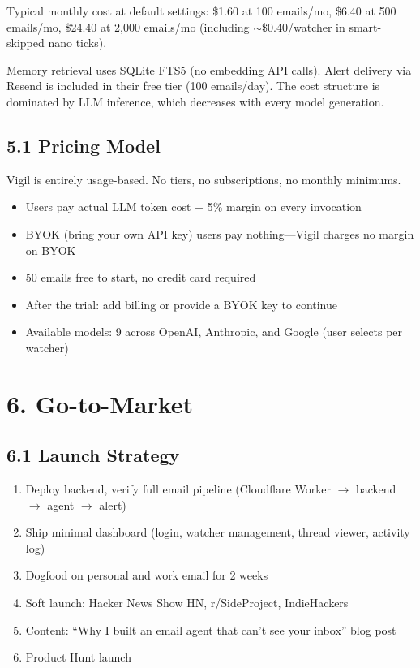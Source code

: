 \documentclass[10pt]{article}
\begin{document}
Typical monthly cost at default settings: \$1.60 at 100 emails/mo, \$6.40 at 500 emails/mo,
\$24.40 at 2,000 emails/mo (including $\sim$\$0.40/watcher in smart-skipped nano ticks).

Memory retrieval uses SQLite FTS5 (no embedding API calls). Alert delivery via Resend is included
in their free tier (100 emails/day). The cost structure is dominated by LLM inference, which decreases
with every model generation.

\subsection*{5.1 Pricing Model}
Vigil is entirely usage-based. No tiers, no subscriptions, no monthly minimums.
\begin{itemize}[nosep]
  \item Users pay actual LLM token cost + 5\% margin on every invocation
  \item BYOK (bring your own API key) users pay nothing---Vigil charges no margin on BYOK
  \item 50 emails free to start, no credit card required
  \item After the trial: add billing or provide a BYOK key to continue
  \item Available models: 9 across OpenAI, Anthropic, and Google (user selects per watcher)
\end{itemize}

\section*{6. Go-to-Market}

\subsection*{6.1 Launch Strategy}
\begin{enumerate}[nosep]
  \item Deploy backend, verify full email pipeline (Cloudflare Worker $\rightarrow$ backend $\rightarrow$ agent $\rightarrow$ alert)
  \item Ship minimal dashboard (login, watcher management, thread viewer, activity log)
  \item Dogfood on personal and work email for 2 weeks
  \item Soft launch: Hacker News Show HN, r/SideProject, IndieHackers
  \item Content: ``Why I built an email agent that can't see your inbox'' blog post
  \item Product Hunt launch
\end{enumerate}
\end{document}
